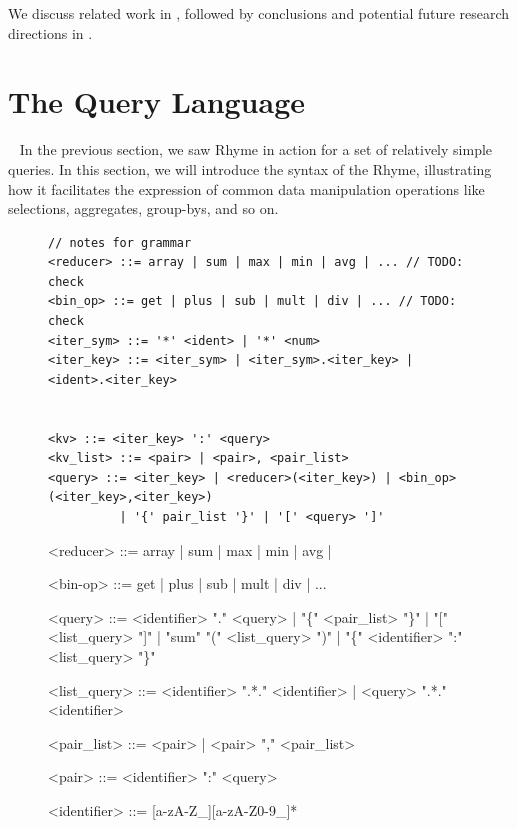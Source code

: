 \documentclass[runningheads]{llncs}
\newcommand{\lang}{Rhyme}
\begin{document}
We discuss related work in , followed by conclusions and potential future research directions
in .


\section{The Query Language}~\label{sec:query_language}
In the previous section, we saw \lang{} in action for a set of relatively simple queries.
In this section, we will introduce the syntax of the \lang{}, illustrating how it facilitates
the expression of common data manipulation operations like selections, aggregates,
group-bys, and so on.

\begin{figure}
\begin{lstlisting}[style=JavaScript, columns=flexible]
// notes for grammar
<reducer> ::= array | sum | max | min | avg | ... // TODO: check
<bin_op> ::= get | plus | sub | mult | div | ... // TODO: check
<iter_sym> ::= '*' <ident> | '*' <num>
<iter_key> ::= <iter_sym> | <iter_sym>.<iter_key> | <ident>.<iter_key>


<kv> ::= <iter_key> ':' <query>
<kv_list> ::= <pair> | <pair>, <pair_list>
<query> ::= <iter_key> | <reducer>(<iter_key>) | <bin_op>(<iter_key>,<iter_key>)
          | '{' pair_list '}' | '[' <query> ']'
\end{lstlisting}
\end{figure}

\begin{figure}
  \footnotesize
\begin{grammar}
<reducer> ::= array | sum | max | min | avg | 

<bin-op> ::= get | plus | sub | mult | div | ... 

  <query> ::= <identifier> "." <query>
            | "\{" <pair\_list> "\}"
            | "[" <list\_query> "]"
            | "sum" "(" <list\_query> ")"
            | "\{" <identifier> ":" <list\_query> "\}"
  
  <list\_query> ::= <identifier> ".*." <identifier>
               | <query> ".*." <identifier>
  
  <pair\_list> ::= <pair>
               | <pair> "," <pair\_list>
  
  <pair> ::= <identifier> ":" <query>
  
  <identifier> ::= [a-zA-Z\_][a-zA-Z0-9\_]*
  
\end{grammar}
\end{figure}
\end{document}
